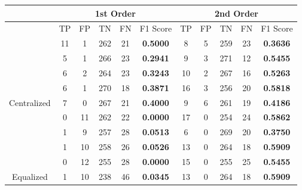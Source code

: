 \documentclass[10pt,a4paper]{article}
\begin{document}
		\begin{table}[!h]
			\centering
			\begin{tabular}{|c|c|c|c|c|c|c|c|c|c|c|}
				\hline
				& \multicolumn{5}{c|}{1st Order}                                                     & \multicolumn{5}{c|}{2nd Order}                              \\ \hline
				& TP & FP & TN  & FN                        & F1 Score                               & TP & FP & TN  & FN & F1 Score                               \\ \hline
				& 11 & 1  & 262 & {\color[HTML]{333333} 21} & {\color[HTML]{FE0000} \textbf{0.5000}} & 8  & 5  & 259 & 23 & {\color[HTML]{FE0000} \textbf{0.3636}} \\ \cline{2-11} 
				& 5  & 1  & 266 & {\color[HTML]{333333} 23} & {\color[HTML]{FE0000} \textbf{0.2941}} & 9  & 3  & 271 & 12 & {\color[HTML]{FE0000} \textbf{0.5455}} \\ \cline{2-11} 
				& 6  & 2  & 264 & {\color[HTML]{333333} 23} & {\color[HTML]{FE0000} \textbf{0.3243}} & 10 & 2  & 267 & 16 & {\color[HTML]{FE0000} \textbf{0.5263}} \\ \cline{2-11} 
				& 6  & 1  & 270 & {\color[HTML]{333333} 18} & {\color[HTML]{FE0000} \textbf{0.3871}} & 16 & 3  & 256 & 20 & {\color[HTML]{FE0000} \textbf{0.5818}} \\ \cline{2-11} 
				\multirow{-5}{*}{Centralized} & 7  & 0  & 267 & {\color[HTML]{333333} 21} & {\color[HTML]{FE0000} \textbf{0.4000}} & 9  & 6  & 261 & 19 & {\color[HTML]{FE0000} \textbf{0.4186}} \\ \hline
				& 0  & 11 & 262 & {\color[HTML]{333333} 22} & {\color[HTML]{FE0000} \textbf{0.0000}} & 17 & 0  & 254 & 24 & {\color[HTML]{FE0000} \textbf{0.5862}} \\ \cline{2-11} 
				& 1  & 9  & 257 & {\color[HTML]{333333} 28} & {\color[HTML]{FE0000} \textbf{0.0513}} & 6  & 0  & 269 & 20 & {\color[HTML]{FE0000} \textbf{0.3750}} \\ \cline{2-11} 
				& 1  & 10 & 258 & {\color[HTML]{333333} 26} & {\color[HTML]{FE0000} \textbf{0.0526}} & 13 & 0  & 264 & 18 & {\color[HTML]{FE0000} \textbf{0.5909}} \\ \cline{2-11} 
				& 0  & 12 & 255 & {\color[HTML]{333333} 28} & {\color[HTML]{FE0000} \textbf{0.0000}} & 15 & 0  & 255 & 25 & {\color[HTML]{FE0000} \textbf{0.5455}} \\ \cline{2-11} 
				\multirow{-5}{*}{Equalized}   & 1  & 10 & 238 & {\color[HTML]{333333} 46} & {\color[HTML]{FE0000} \textbf{0.0345}} & 13 & 0  & 264 & 18 & {\color[HTML]{FE0000} \textbf{0.5909}} \\ \hline
			\end{tabular}
		\end{table}
		
\end{document}
